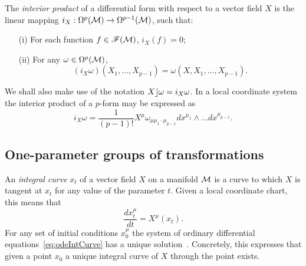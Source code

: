 \documentclass[
final,
11pt,
a4paper,
DIV=11,
headinclude=true,
footinclude=false,
bibliography=totoc,
twoside=true,  %
BCOR=5mm
]{scrbook}
\begin{document}
\begin{definition}
The \emph{interior product} of a differential form with respect 
to a vector field $X$ is the linear mapping $i_X 
: \Omega^p(\mathcal{M}) \to \Omega^{p-1}(\mathcal{M})$, such that:
\begin{itemize}
  \item[(i)] For each function $f \in \mathscr{F}(\mathcal{M})$, 
    $i_X(f) = 0$;
  \item[(ii)] For any $\omega \in \Omega^p(\mathcal{M})$,
    \begin{equation*}
      (i_X \omega)(X_1,\ldots,X_{p-1})      
      = \omega(X,X_1,\ldots,X_{p-1}).
    \end{equation*}
\end{itemize}
\end{definition}
We shall also make use of the notation $X\rfloor\omega = i_X \omega$.  
In a local coordinate system the interior product of a $p$-form 
may be expressed as
\begin{equation*}
  i_X\omega = \frac{1}{(p-1)!} X^\mu \omega_{\mu\mu_1 \cdot 
    \mu_{p-1}} dx^{\mu_1} \wedge \ldots dx^{\mu_{p-1}}.
\end{equation*}

\subsection{One-parameter groups of transformations}
\label{ssec:one-par_groups_trafo}

An \emph{integral curve} $x_t$ of a vector field $X$ on a 
manifold $\mathcal{M}$ is a curve to which $X$ is tangent at $x_t$ for 
any value of the parameter $t$. Given a local coordinate chart, 
this means that
\begin{equation}
\label{eq:odeIntCurve}
  \frac{dx_t^\mu}{dt} = X^\mu(x_t).
\end{equation}
For any set of initial conditions $x^\mu_0$ the system of 
ordinary differential equations~\eqref{eq:odeIntCurve} has 
a unique solution~\cite{loomis:1990ac}.  Concretely, this 
expresses that given a point $x_0$ a unique integral curve of $X$ 
through the point exists.
\end{document}
